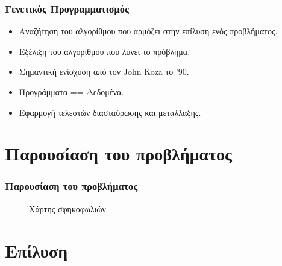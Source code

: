 \documentclass[xetex,mathserif,serif,14pt]{beamer}
\begin{document}
\begin{frame}
\frametitle{Γενετικός Προγραμματισμός}
\begin{itemize}
  \item Αναζήτηση του αλγορίθμου που αρμόζει στην επίλυση ενός προβλήματος.
  \item Εξέλιξη του αλγορίθμου που λύνει το πρόβλημα.
  \item Σημαντική ενίσχυση από τον John Koza το '90.
  \item Προγράμματα == Δεδομένα.
  \item Εφαρμογή τελεστών διασταύρωσης και μετάλλαξης.
\end{itemize}
\end{frame}


\section{Παρουσίαση του προβλήματος}

\begin{frame}
\frametitle{Παρουσίαση του προβλήματος}
\begin{figure}[!t]
    \centering
    \caption{Χάρτης σφηκοφωλιών}
    \label{fig_waspNestsMap}
\end{figure}
\end{frame}


\section{Επίλυση}
\end{document}
